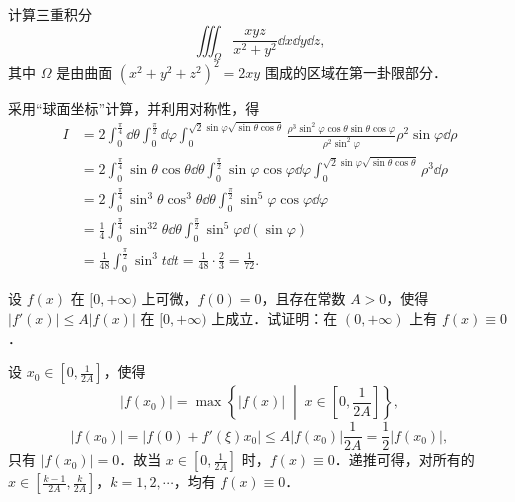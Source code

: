 计算三重积分
\[
  \iiint_{\Omega}\frac{xyz}{x^2+y^2}\dd x\dd y\dd z,
\]
其中 $\Omega$ 是由曲面 $(x^2+y^2+z^2)^2=2xy$ 围成的区域在第一卦限部分．
\begin{solution}
采用“球面坐标”计算，并利用对称性，得
\begin{align*}
I&=2\int_0^{\frac{\pi}{4}}\dd\theta\int_0^{\frac{\pi}{2}}\dd\varphi
\int_0^{\sqrt2\sin\varphi\sqrt{\sin\theta\cos\theta}}
\frac{\rho^3\sin^2\varphi\cos\theta\sin\theta\cos\varphi}{\rho^2\sin^2\varphi}\rho^2\sin\varphi\dd\rho\\
&=2\int_0^{\frac{\pi}{4}}\sin\theta\cos\theta\dd\theta
\int_0^{\frac{\pi}{2}}\sin\varphi\cos\varphi\dd\varphi
\int_0^{\sqrt2\sin\varphi\sqrt{\sin\theta\cos\theta}}\rho^3\dd\rho\\
&=2\int_0^{\frac{\pi}{4}}\sin^3\theta\cos^3\theta\dd\theta
\int_0^{\frac{\pi}{2}}\sin^5\varphi\cos\varphi\dd\varphi\\
&=\frac{1}{4}\int_0^{\frac{\pi}{4}}\sin^32\theta\dd\theta
\int_0^{\frac{\pi}{2}}\sin^5\varphi\dd(\sin\varphi)\\
&=\frac{1}{48}\int_0^{\frac{\pi}{2}}\sin^3t\dd t
=\frac{1}{48}\cdot\frac{2}{3}=\frac{1}{72}.
\end{align*}
\end{solution}

设 $f(x)$ 在 $[0,+\infty)$ 上可微，$f(0)=0$，且存在常数 $A>0$，使得 $|f'(x)|\le A|f(x)|$ 在 $[0,+\infty)$ 上成立．试证明：在 $(0,+\infty)$ 上有 $f(x)\equiv 0$．
\begin{solution}
设 $x_0\in\left[0,\frac{1}{2A}\right]$，使得
\[
|f(x_0)|=\max\left\{|f(x)|\;\middle|\;x\in\left[0,\frac{1}{2A}\right]\right\},
\]
\[
|f(x_0)|=|f(0)+f'(\xi)x_0|\le A|f(x_0)|\frac{1}{2A}=\frac{1}{2}|f(x_0)|,
\]
只有 $|f(x_0)|=0$．故当 $x\in\left[0,\frac{1}{2A}\right]$ 时，$f(x)\equiv0$．递推可得，对所有的 $x\in\left[\frac{k-1}{2A},\frac{k}{2A}\right]$，$k=1,2,\cdots$，均有 $f(x)\equiv0$．
\end{solution}

